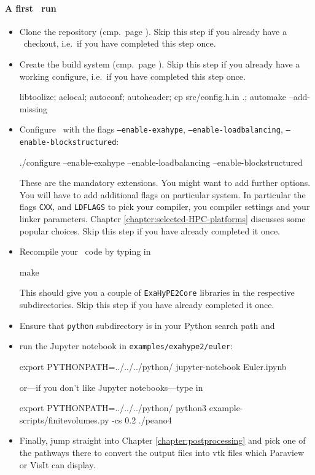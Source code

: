 \begin{framed}
\paragraph*{A first \ExaHyPE\ run}
\begin{itemize}
  \item Clone the repository (cmp.~page
  \pageref{page::installation::git-clone}). Skip this step if you already have a
  \Peano\ checkout, i.e.~if you have completed this step once.
  \item Create the build system (cmp.~page
  \pageref{page::installation::configure}). Skip this step if you already have a
  working configure, i.e.~if you have completed this step once.
  \begin{bash}
libtoolize; aclocal; autoconf; autoheader; cp src/config.h.in .; automake --add-missing
  \end{bash}
  \item Configure \Peano\ with the flags \texttt{--enable-exahype},
  \texttt{--enable-loadbalancing}, \texttt{--enable-blockstructured}:
  \begin{bash}
./configure --enable-exahype --enable-loadbalancing --enable-blockstructured
  \end{bash}
   These are the mandatory extensions. You might want to add further options.
   You will have to add additional flags on particular system. In particular the
   flags \texttt{CXX},  and \texttt{LDFLAGS} to pick your
   compiler, you compiler settings and your linker parameters. Chapter
   \ref{chapter:selected-HPC-platforms} discusses some popular choices. Skip
   this step if you have already completed it once.
  \item Recompile your \Peano\ code by typing in
  \begin{bash}
make
  \end{bash}
   This should give you a couple
  of \texttt{ExaHyPE2Core} libraries in the respective subdirectories. Skip this
  step if you have already completed it once.
  \item Ensure that \texttt{python} subdirectory is in your Python search path
  and
  \item run the Jupyter notebook in \texttt{examples/exahype2/euler}: 
  \begin{bash}
export PYTHONPATH=../../../python/
jupyter-notebook Euler.ipynb
  \end{bash}
  \noindent
  or---if you don't like Jupyter notebooks---type in
  \begin{bash}
export PYTHONPATH=../../../python/
python3 example-scripts/finitevolumes.py -cs 0.2
./peano4
  \end{bash}
  \item Finally, jump straight into Chapter \ref{chapter:postprocessing} and
  pick one of the pathways there to convert the output files into vtk files
  which Paraview or VisIt can display.
\end{itemize}
\end{framed}



